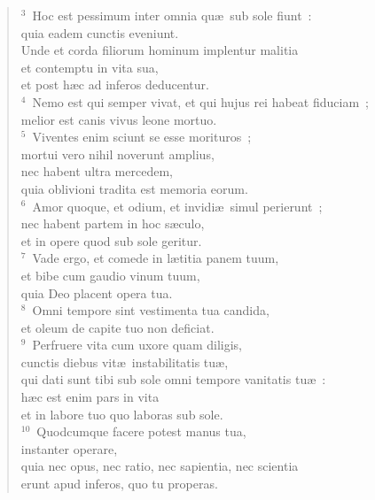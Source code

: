 \begin{verse}${}^{3}$~Hoc est pessimum inter omnia qu\ae\ sub sole fiunt~:\\ quia eadem cunctis eveniunt.\\ Unde et corda filiorum hominum implentur malitia\\ et contemptu in vita sua,\\ et post h\ae c ad inferos deducentur.\\
${}^{4}$~Nemo est qui semper vivat, et qui hujus rei habeat fiduciam~;\\ melior est canis vivus leone mortuo.\\
${}^{5}$~Viventes enim sciunt se esse morituros~;\\ mortui vero nihil noverunt amplius,\\ nec habent ultra mercedem,\\ quia oblivioni tradita est memoria eorum.\\
${}^{6}$~Amor quoque, et odium, et invidi\ae\ simul perierunt~;\\ nec habent partem in hoc s\ae culo,\\ et in opere quod sub sole geritur.\\
${}^{7}$~Vade ergo, et comede in l\ae titia panem tuum,\\ et bibe cum gaudio vinum tuum,\\ quia Deo placent opera tua.\\
${}^{8}$~Omni tempore sint vestimenta tua candida,\\ et oleum de capite tuo non deficiat.\\
${}^{9}$~Perfruere vita cum uxore quam diligis,\\ cunctis diebus vit\ae\ instabilitatis tu\ae ,\\ qui dati sunt tibi sub sole omni tempore vanitatis tu\ae~:\\ h\ae c est enim pars in vita\\ et in labore tuo quo laboras sub sole.\\
${}^{10}$~Quodcumque facere potest manus tua,\\ instanter operare,\\ quia nec opus, nec ratio, nec sapientia, nec scientia\\ erunt apud inferos, quo tu properas.\end{verse}


